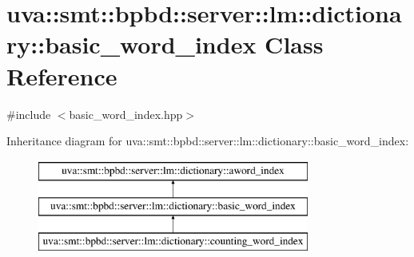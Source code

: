 \hypertarget{classuva_1_1smt_1_1bpbd_1_1server_1_1lm_1_1dictionary_1_1basic__word__index}{}\section{uva\+:\+:smt\+:\+:bpbd\+:\+:server\+:\+:lm\+:\+:dictionary\+:\+:basic\+\_\+word\+\_\+index Class Reference}
\label{classuva_1_1smt_1_1bpbd_1_1server_1_1lm_1_1dictionary_1_1basic__word__index}


{\ttfamily \#include $<$basic\+\_\+word\+\_\+index.\+hpp$>$}

Inheritance diagram for uva\+:\+:smt\+:\+:bpbd\+:\+:server\+:\+:lm\+:\+:dictionary\+:\+:basic\+\_\+word\+\_\+index\+:\begin{figure}[H]
\begin{center}
\leavevmode
\includegraphics[height=3.000000cm]{classuva_1_1smt_1_1bpbd_1_1server_1_1lm_1_1dictionary_1_1basic__word__index}
\end{center}
\end{figure}
